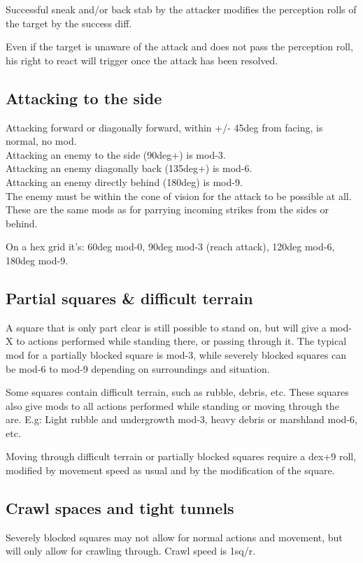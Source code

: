 Successful sneak and/or back stab by the attacker modifies the perception rolls of the target by the success diff.

Even if the target is unaware of the attack and does not pass the perception roll, his right to react will trigger once the attack has been resolved.


\subsection*{Attacking to the side}
Attacking forward or diagonally forward, within +/- 45deg from facing, is normal, no mod. \\
Attacking an enemy to the side (90deg+) is mod-3. \\
Attacking an enemy diagonally back (135deg+) is mod-6. \\
Attacking an enemy directly behind (180deg) is mod-9. \\
The enemy must be within the cone of vision for the attack to be possible at all. \\
These are the same mods as for parrying incoming strikes from the sides or behind.

On a hex grid it's: 60deg mod-0, 90deg mod-3 (reach attack), 120deg mod-6, 180deg mod-9.


\subsection*{Partial squares \& difficult terrain}
A square that is only part clear is still possible to stand on, but will give a mod-X to actions performed while standing there, or passing through it. The typical mod for a partially blocked square is mod-3, while severely blocked squares can be mod-6 to mod-9 depending on surroundings and situation.

Some squares contain difficult terrain, such as rubble, debris, etc. These squares also give mods to all actions performed while standing or moving through the are. E.g: Light rubble and undergrowth mod-3, heavy debris or marshland mod-6, etc.

Moving through difficult terrain or partially blocked squares require a dex+9 roll, modified by movement speed as usual and by the modification of the square.


\subsection*{Crawl spaces and tight tunnels}
Severely blocked squares may not allow for normal actions and movement, but will only allow for crawling through. Crawl speed is 1sq/r.

